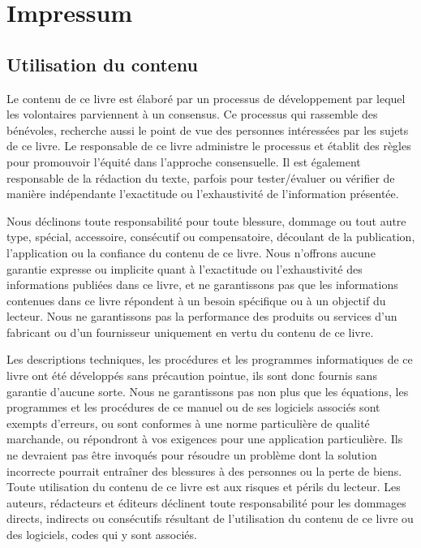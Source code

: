 	\newpage
	\thispagestyle{empty}
	\mbox{}
	\section{Impressum}	
	\subsection{Utilisation du contenu}

	Le contenu de ce livre est élaboré par un processus de développement par lequel les volontaires parviennent à un consensus. Ce processus qui rassemble des bénévoles, recherche aussi le point de vue des personnes intéressées par les sujets de ce livre. Le responsable de ce livre administre le processus et établit des règles pour promouvoir l'équité dans l'approche consensuelle. Il est également responsable de la rédaction du texte, parfois pour tester/évaluer ou vérifier de manière indépendante l'exactitude ou l'exhaustivité de l'information présentée.

	Nous déclinons toute responsabilité pour toute blessure, dommage ou tout autre type, spécial, accessoire, consécutif ou compensatoire, découlant de la publication, l'application ou la confiance du contenu de ce livre. Nous n'offrons aucune garantie expresse ou implicite quant à l'exactitude ou l'exhaustivité des informations publiées dans ce livre, et ne garantissons pas que les informations contenues dans ce livre répondent à un besoin spécifique ou à un objectif du lecteur. Nous ne garantissons pas la performance des produits ou services d'un fabricant ou d'un fournisseur uniquement en vertu du contenu de ce livre.
	
	Les descriptions techniques, les procédures et les programmes informatiques de ce livre ont été développés sans précaution pointue, ils sont donc fournis sans garantie d'aucune sorte. Nous ne garantissons pas non plus que les équations, les programmes et les procédures de ce manuel ou de ses logiciels associés sont exempts d'erreurs, ou sont conformes à une norme particulière de qualité marchande, ou répondront à vos exigences pour une application particulière. Ils ne devraient pas être invoqués pour résoudre un problème dont la solution incorrecte pourrait entraîner des blessures à des personnes ou la perte de biens. Toute utilisation du contenu de ce livre est aux risques et périls du lecteur. Les auteurs, rédacteurs et éditeurs déclinent toute responsabilité pour les dommages directs, indirects ou consécutifs résultant de l'utilisation du contenu de ce livre ou des logiciels, codes  qui y sont associés.

